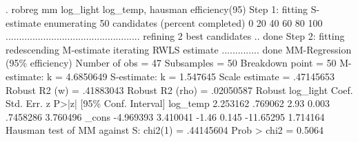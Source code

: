 . robreg mm log_light log_temp, hausman efficiency(95)
{\smallskip}
Step 1: fitting S-estimate
{\smallskip}
enumerating 50 candidates (percent completed)
0  20  40  60  80  100
..................................................
{\smallskip}
refining 2 best candidates .. done
{\smallskip}
Step 2: fitting redescending M-estimate
{\smallskip}
iterating RWLS estimate .............. done
{\smallskip}
MM-Regression (95\% efficiency)                  Number of obs     =         47
                                                  Subsamples      =         50
                                                  Breakdown point =         50
                                                  M-estimate: k   =  4.6850649
                                                  S-estimate: k   =   1.547645
                                                  Scale estimate  =  .47145653
                                                  Robust R2 (w)   =  .41883043
                                                  Robust R2 (rho) =  .02050587
{\smallskip}
             {\VBAR}               Robust
   log_light {\VBAR}      Coef.   Std. Err.      z    P>|z|     [95\% Conf. Interval]
    log_temp {\VBAR}   2.253162    .769062     2.93   0.003     .7458286    3.760496
       _cons {\VBAR}  -4.969393   3.410041    -1.46   0.145    -11.65295    1.714164
Hausman test of MM against S:    chi2(1) = .44145604      Prob > chi2 = 0.5064
{\smallskip}
